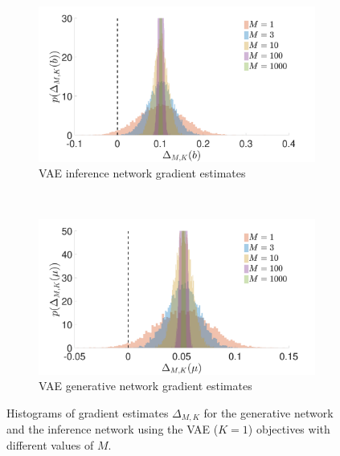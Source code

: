 \begin{figure}[h]
	\centering
		\begin{subfigure}[b]{0.45\textwidth}
			\centering
			\includegraphics[width=\textwidth]{figures/tighter_bounds/b_hist_VAE}
			\caption{\gls{VAE} inference network gradient estimates \label{fig:snr/b_hist_vae}}
		\end{subfigure} ~~~~~~~~~~
		\begin{subfigure}[b]{0.45\textwidth}
			\centering
			\includegraphics[width=\textwidth]{figures/tighter_bounds/mu_hist_VAE}
			\caption{\gls{VAE} generative network gradient estimates \label{fig:snr/mu_hist_vae}}
		\end{subfigure}
	\caption{Histograms of gradient estimates $\Delta_{M,K}$ for the generative network and 
		the	inference network using the \gls{VAE} ($K=1$) objectives with different values of $M$. \vspace{-12pt}
		\label{fig:snr/hists-vae}}
\end{figure}

